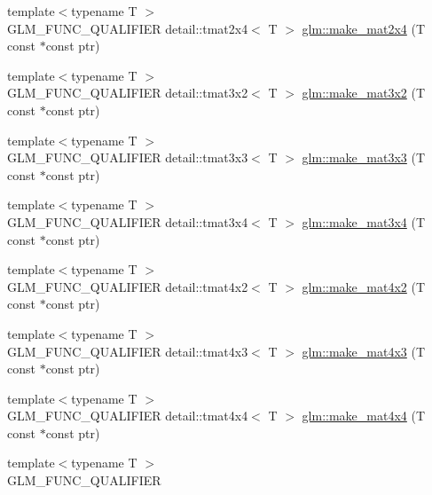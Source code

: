 \begin{DoxyCompactItemize}
\item 
{\footnotesize template$<$typename T $>$ }\\\-G\-L\-M\-\_\-\-F\-U\-N\-C\-\_\-\-Q\-U\-A\-L\-I\-F\-I\-E\-R \*
detail\-::tmat2x4$<$ \-T $>$ \hyperlink{group__gtc__type__ptr_gad964b2474436360ad7ddc72476cd825d}{glm\-::make\-\_\-mat2x4} (\-T const $\ast$const ptr)
\item 
{\footnotesize template$<$typename T $>$ }\\\-G\-L\-M\-\_\-\-F\-U\-N\-C\-\_\-\-Q\-U\-A\-L\-I\-F\-I\-E\-R \*
detail\-::tmat3x2$<$ \-T $>$ \hyperlink{group__gtc__type__ptr_ga860ede9212a7fe27f6e0819a6751bd65}{glm\-::make\-\_\-mat3x2} (\-T const $\ast$const ptr)
\item 
{\footnotesize template$<$typename T $>$ }\\\-G\-L\-M\-\_\-\-F\-U\-N\-C\-\_\-\-Q\-U\-A\-L\-I\-F\-I\-E\-R \*
detail\-::tmat3x3$<$ \-T $>$ \hyperlink{group__gtc__type__ptr_ga4a59d30459cfd98f66678298509ad6db}{glm\-::make\-\_\-mat3x3} (\-T const $\ast$const ptr)
\item 
{\footnotesize template$<$typename T $>$ }\\\-G\-L\-M\-\_\-\-F\-U\-N\-C\-\_\-\-Q\-U\-A\-L\-I\-F\-I\-E\-R \*
detail\-::tmat3x4$<$ \-T $>$ \hyperlink{group__gtc__type__ptr_ga56f6c18963f12ff629528a5a38220f84}{glm\-::make\-\_\-mat3x4} (\-T const $\ast$const ptr)
\item 
{\footnotesize template$<$typename T $>$ }\\\-G\-L\-M\-\_\-\-F\-U\-N\-C\-\_\-\-Q\-U\-A\-L\-I\-F\-I\-E\-R \*
detail\-::tmat4x2$<$ \-T $>$ \hyperlink{group__gtc__type__ptr_ga8d47171932ef5a9e01532a0826fac8dd}{glm\-::make\-\_\-mat4x2} (\-T const $\ast$const ptr)
\item 
{\footnotesize template$<$typename T $>$ }\\\-G\-L\-M\-\_\-\-F\-U\-N\-C\-\_\-\-Q\-U\-A\-L\-I\-F\-I\-E\-R \*
detail\-::tmat4x3$<$ \-T $>$ \hyperlink{group__gtc__type__ptr_ga7cb5d674738de1fba4d25d846045605c}{glm\-::make\-\_\-mat4x3} (\-T const $\ast$const ptr)
\item 
{\footnotesize template$<$typename T $>$ }\\\-G\-L\-M\-\_\-\-F\-U\-N\-C\-\_\-\-Q\-U\-A\-L\-I\-F\-I\-E\-R \*
detail\-::tmat4x4$<$ \-T $>$ \hyperlink{group__gtc__type__ptr_ga06ffad3cc8cbf921588f48037f1e1a2a}{glm\-::make\-\_\-mat4x4} (\-T const $\ast$const ptr)
\item 
{\footnotesize template$<$typename T $>$ }\\\-G\-L\-M\-\_\-\-F\-U\-N\-C\-\_\-\-Q\-U\-A\-L\-I\-F\-I\-E\-R \*

\end{DoxyCompactItemize}
